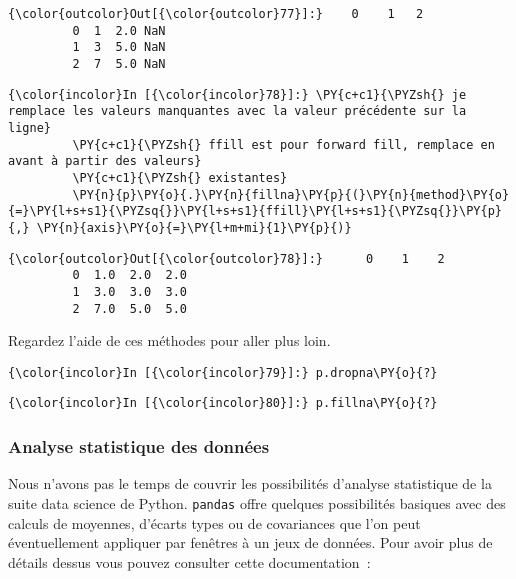 \begin{Verbatim}[commandchars=\\\{\}]
{\color{outcolor}Out[{\color{outcolor}77}]:}    0    1   2
         0  1  2.0 NaN
         1  3  5.0 NaN
         2  7  5.0 NaN
\end{Verbatim}
            
    \begin{Verbatim}[commandchars=\\\{\}]
{\color{incolor}In [{\color{incolor}78}]:} \PY{c+c1}{\PYZsh{} je remplace les valeurs manquantes avec la valeur précédente sur la ligne}
         \PY{c+c1}{\PYZsh{} ffill est pour forward fill, remplace en avant à partir des valeurs}
         \PY{c+c1}{\PYZsh{} existantes}
         \PY{n}{p}\PY{o}{.}\PY{n}{fillna}\PY{p}{(}\PY{n}{method}\PY{o}{=}\PY{l+s+s1}{\PYZsq{}}\PY{l+s+s1}{ffill}\PY{l+s+s1}{\PYZsq{}}\PY{p}{,} \PY{n}{axis}\PY{o}{=}\PY{l+m+mi}{1}\PY{p}{)}
\end{Verbatim}


\begin{Verbatim}[commandchars=\\\{\}]
{\color{outcolor}Out[{\color{outcolor}78}]:}      0    1    2
         0  1.0  2.0  2.0
         1  3.0  3.0  3.0
         2  7.0  5.0  5.0
\end{Verbatim}
            
    Regardez l'aide de ces méthodes pour aller plus loin.

    \begin{Verbatim}[commandchars=\\\{\}]
{\color{incolor}In [{\color{incolor}79}]:} p.dropna\PY{o}{?}
\end{Verbatim}


    \begin{Verbatim}[commandchars=\\\{\}]
{\color{incolor}In [{\color{incolor}80}]:} p.fillna\PY{o}{?}
\end{Verbatim}


    \hypertarget{analyse-statistique-des-donnuxe9es}{%
\subsubsection{Analyse statistique des
données}\label{analyse-statistique-des-donnuxe9es}}

    Nous n'avons pas le temps de couvrir les possibilités d'analyse
statistique de la suite data science de Python. \texttt{pandas} offre
quelques possibilités basiques avec des calculs de moyennes, d'écarts
types ou de covariances que l'on peut éventuellement appliquer par
fenêtres à un jeux de données. Pour avoir plus de détails dessus vous
pouvez consulter cette documentation~:

